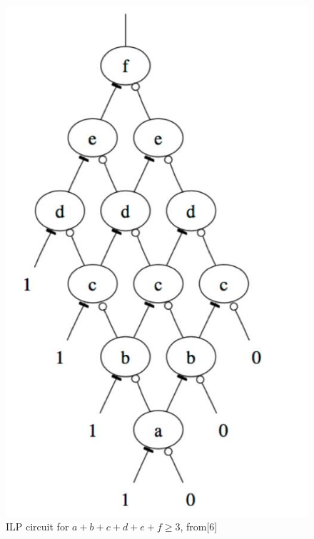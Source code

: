     \begin{figure}[H]
    \centering
    \includegraphics[scale=0.25]{images/ILP}
    \caption{ILP circuit for $a+b+c+d+e+f \geq 3$, from[6]}
    \end{figure}


